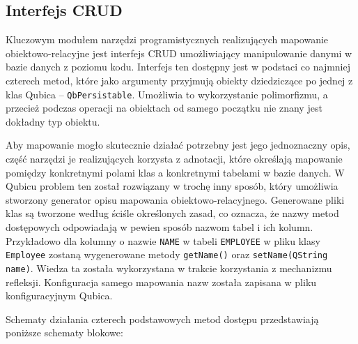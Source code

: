 \documentclass[12pt]{report}
\begin{document}
\subsection{Interfejs CRUD}

Kluczowym modułem narzędzi programistycznych realizujących mapowanie obiekt\-owo-relacyjne jest interfejs CRUD umożliwiający manipulowanie danymi w bazie danych z 
poziomu kodu. Interfejs ten dostępny jest w podstaci co najmniej czterech metod, które jako argumenty przyjmują obiekty dziedziczące po jednej z klas Qubica -- 
{\tt QbPersistable}. Umożliwia to wykorzystanie polimorfizmu, a przecież podczas operacji na obiektach od samego początku nie znany jest dokładny typ obiektu.

Aby mapowanie mogło skutecznie działać potrzebny jest jego jednoznaczny opis, część narzędzi je realizujących korzysta z adnotacji, które określają mapowanie pomiędzy
konkretnymi polami klas a konkretnymi tabelami w bazie danych. W Qubicu problem ten został rozwiązany w trochę inny sposób, który umożliwia stworzony generator opisu
mapowania obiektowo-relacyjnego. Generowane pliki klas są tworzone według ściśle określonych zasad, co oznacza, że nazwy metod dostępowych odpowiadają w pewien
sposób nazwom tabel i ich kolumn. Przykładowo dla kolumny o nazwie {\tt NAME} w tabeli {\tt EMPLOYEE} w pliku klasy {\tt Employee} zostaną wygenerowane metody 
{\tt getName()} oraz {\tt setName(QString name)}. Wie\-dza ta została wykorzystana w trakcie korzystania z mechanizmu refleksji. Konfiguracja samego mapowania nazw
została zapisana w pliku konfiguracyjnym Qubica.

Schematy działania czterech podstawowych metod dostępu przedstawiają po\-niższe schematy blokowe:
\end{document}
